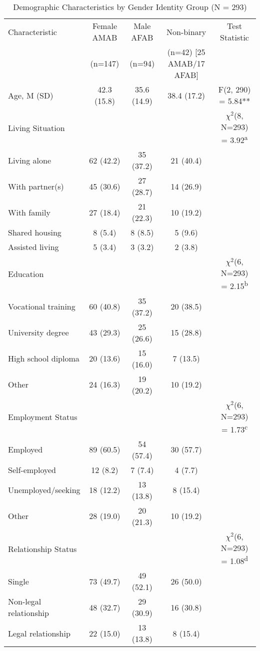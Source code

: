 \documentclass[12pt,a4paper]{article}
\begin{document}
\begin{table}[htbp]
\centering
\small
\caption{Demographic Characteristics by Gender Identity Group (N = 293)}
\begin{tabular}{lcccc}
\toprule
Characteristic & Female AMAB & Male AFAB & Non-binary & Test Statistic\\
& (n=147) & (n=94) & (n=42) [25 AMAB/17 AFAB] & \\
\midrule
Age, M (SD) & 42.3 (15.8) & 35.6 (14.9) & 38.4 (17.2) & F(2, 290) = 5.84**\\
Living Situation & & & & $\chi^2$(8, N=293) = 3.92\textsuperscript{a}\\
\quad Living alone & 62 (42.2) & 35 (37.2) & 21 (40.4) & \\
\quad With partner(s) & 45 (30.6) & 27 (28.7) & 14 (26.9) & \\
\quad With family & 27 (18.4) & 21 (22.3) & 10 (19.2) & \\
\quad Shared housing & 8 (5.4) & 8 (8.5) & 5 (9.6) & \\
\quad Assisted living & 5 (3.4) & 3 (3.2) & 2 (3.8) & \\
Education & & & & $\chi^2$(6, N=293) = 2.15\textsuperscript{b}\\
\quad Vocational training & 60 (40.8) & 35 (37.2) & 20 (38.5) & \\
\quad University degree & 43 (29.3) & 25 (26.6) & 15 (28.8) & \\
\quad High school diploma & 20 (13.6) & 15 (16.0) & 7 (13.5) & \\
\quad Other & 24 (16.3) & 19 (20.2) & 10 (19.2) & \\
Employment Status & & & & $\chi^2$(6, N=293) = 1.73\textsuperscript{c}\\
\quad Employed & 89 (60.5) & 54 (57.4) & 30 (57.7) & \\
\quad Self-employed & 12 (8.2) & 7 (7.4) & 4 (7.7) & \\
\quad Unemployed/seeking & 18 (12.2) & 13 (13.8) & 8 (15.4) & \\
\quad Other & 28 (19.0) & 20 (21.3) & 10 (19.2) & \\
Relationship Status & & & & $\chi^2$(6, N=293) = 1.08\textsuperscript{d}\\
\quad Single & 73 (49.7) & 49 (52.1) & 26 (50.0) & \\
\quad Non-legal relationship & 48 (32.7) & 29 (30.9) & 16 (30.8) & \\
\quad Legal relationship & 22 (15.0) & 13 (13.8) & 8 (15.4) & \\

\end{tabular}
\end{table}
\end{document}
